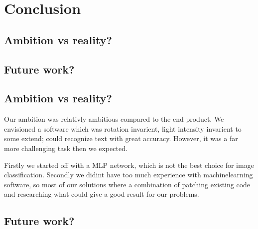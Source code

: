 \documentclass[Report.tex]{subfiles}
\begin{document}
\chapter{Conclusion}
\label{chap:Conclusion}
\section{Ambition vs reality?}
\section{Future work?}

\section{Ambition vs reality?}
Our ambition was relativly ambitious compared to the end product. We envisioned
a software which was rotation invarient, light intensity invarient to some
extend; could recognize text with great accuracy. However, it was a far more
challenging task then we expected. \par
Firstly we started off with a MLP network, which is not the best choice for
image classification. Secondly we didint have too much experience with
machinelearning software, so most of our solutions where a combination of
patching existing code and researching what could give a good result for
our problems.


\section{Future work?}
\end{document}
